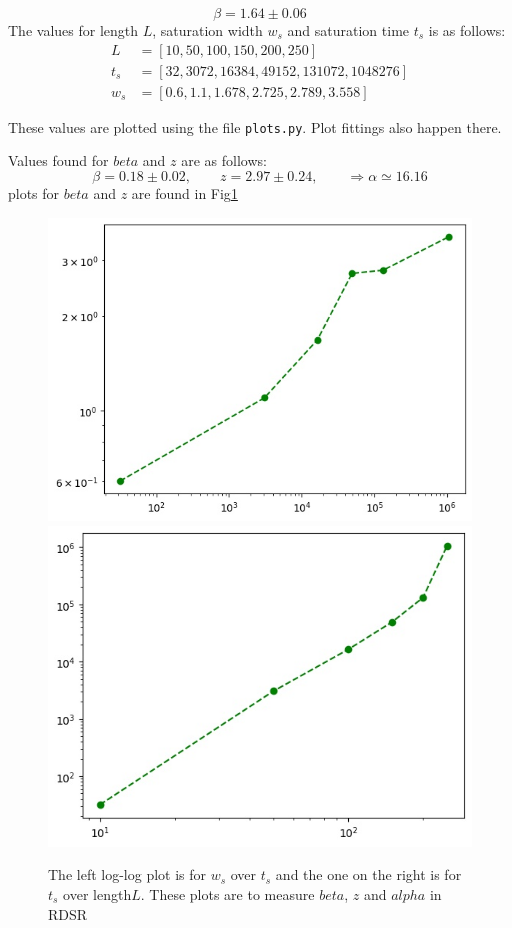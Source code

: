 \documentclass[12pt]{article}
\begin{document}
	\begin{equation*}
		\beta = 1.64 \pm 0.06
	\end{equation*}
	The values for length $L$, saturation width $w_s$ and saturation time $t_s$ is as follows:
	\begin{equation*}
		\begin{aligned}
			L		 &= [10, 50, 100, 150, 200, 250]\\
			t_s		&= [32, 3072, 16384, 49152, 131072, 1048276]\\
			w_s	  &= [0.6, 1.1, 1.678, 2.725, 2.789, 3.558] 
		\end{aligned}
	\end{equation*}
	
	These values are plotted using the file \texttt{plots.py}. Plot fittings also happen there.
	
	Values found for $beta$ and $z$ are as follows:
	\begin{equation*}
		\beta = 0.18 \pm 0.02, \qquad z = 2.97 \pm 0.24, \qquad \Rightarrow \alpha \simeq 16.16
	\end{equation*}
	plots for $beta$ and $z$ are found in Fig\ref{fig:beta_z}
	\begin{figure}[h!]
		\centering
		\includegraphics[width=.4\linewidth]{../P5/beta.jpg}
		\includegraphics[width=.4\linewidth]{../P5/z.jpg}
		\label{fig:beta_z}
		\caption{The left log-log plot is for $w_s$ over $t_s$ and the one on the right is for 
		$t_s$ over length$L$. These plots are to measure $beta$, $z$ and $alpha$ in RDSR}
	\end{figure}
	
\end{document}
